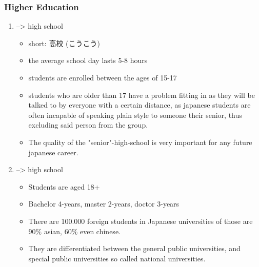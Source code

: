 \documentclass{article}
\begin{document}
\subsubsection{Higher Education}
\begin{enumerate}
\item {} --> high school
\begin{itemize}
\item short: 高校 (こうこう)
\item the average school day lasts 5-8 hours
\item students are enrolled between the ages of 15-17
\item students who are older than 17 have a problem fitting in as they will be talked to by everyone with a certain distance, as japanese students are often incapable of speaking plain style to someone their senior, thus excluding said person from the group.
\item The quality of the "senior"-high-school is very important for any future japanese career.
\end{itemize}
\item {} --> high school
\begin{itemize}
\item Students are aged 18+
\item Bachelor 4-years, master 2-years, doctor 3-years
\item There are 100.000 foreign students in Japanese universities of those are 90\% asian, 60\% even chinese.
\item They are differentiated between the  general public universities, and special public universities so called  national universities.
\end{itemize}
\end{enumerate}
\end{document}
